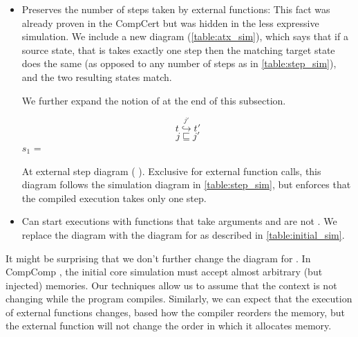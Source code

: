 \begin{itemize}
\item Preserves the number of steps taken by external functions: This fact was already proven in the CompCert but was hidden in the less expressive simulation. We include a new diagram (\ref{table:atx_sim}),  which says that if a source state, that is  takes exactly one step then the matching target state does the same (as opposed to any number of steps as in  \ref{table:step_sim}), and the two resulting states match. 

We further expand the notion of  at the end of this subsection.

\begin{table}\centering\begin{multicols}{2}

$$t \overset{j'}{\hookrightarrow} t'$$
$$j \sqsubseteq j'$$
 $s_1$ = 
\end{multicols}

\caption{At external step diagram ( ). Exclusive for external function calls, this diagram follows the simulation diagram in \ref{table:step_sim}, but enforces that the compiled execution takes only one step. }\label{table:atx_sim}
\end{table}

\item Can start executions with functions that take arguments and are not . We replace the  diagram with  the diagram for  as described in \ref{table:initial_sim}.

\end{itemize}

It might be surprising that we don't further change the diagram for . In CompComp \cite{compcomp}, the initial core simulation must accept almost arbitrary (but injected) memories. Our techniques allow us to assume that the context is not changing while the program compiles. Similarly, we can expect that the execution of external functions changes, based how the compiler reorders the memory, but the external function will not change the order in which it allocates memory.

